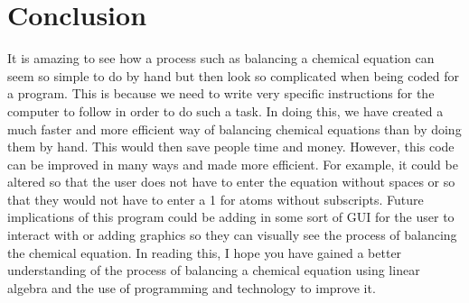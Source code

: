 \documentclass[10pt]{article}
\begin{document}
\section{Conclusion}
It is amazing to see how a process such as balancing a chemical equation can seem so simple to do by hand but then look so
complicated when being coded for a program. This is because we need to write very specific instructions for the computer to
follow in order to do such a task. In doing this, we have created a much faster and more efficient way of balancing chemical
equations than by doing them by hand. This would then save people time and money. However, this code can be improved in
many ways and made more efficient. For example, it could be altered so that the user does not have to enter the equation
without spaces or so that they would not have to enter a 1 for atoms without subscripts. Future implications of this program
could be adding in some sort of GUI for the user to interact with or adding graphics so they can visually see the process of
balancing the chemical equation. In reading this, I hope you have gained a better understanding of the process of balancing a
chemical equation using linear algebra and the use of programming and technology to improve it.
\end{document}

